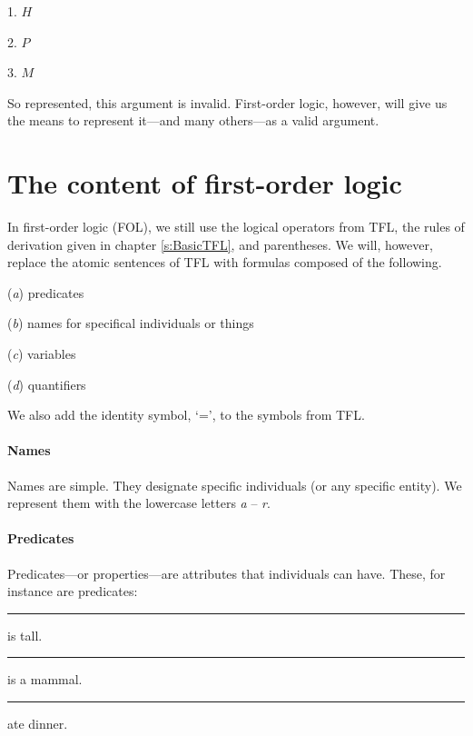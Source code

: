 \noindent\begin{minipage}{0.99\textwidth}
\bigskip
\begin{earg}
\item[1.] $H$
\item[2.] $P$
\item[3.] $M$
\end{earg}
\smallskip
\end{minipage}

\noindent So represented, this argument is invalid. First-order logic, however, will give us the means to represent it---and many others---as a valid argument.


\section{The content of first-order logic}

In first-order logic (FOL), we still use the logical operators from TFL, the rules of derivation given in chapter \ref{s:BasicTFL}, and parentheses. We will, however, replace the atomic sentences of TFL with formulas composed of the following.

\begin{ebullet}
	\item[(\textit{a})] predicates
	\item[(\textit{b})] names for specifical individuals or things 
	\item[(\textit{c})] variables 
	\item[(\textit{d})] quantifiers
\end{ebullet}
We also add the identity symbol, ‘=’, to the symbols from TFL.  


\paragraph{Names}

Names are simple. They designate specific individuals (or any specific entity). We represent them with the lowercase letters \textit{a} -- \textit{r}.

\paragraph{Predicates}

Predicates---or properties---are attributes that individuals can have. These, for instance are predicates:

\begin{ebullet}
	\item[] \rule{1cm}{0.15mm} is tall.
	\item[] \rule{1cm}{0.15mm} is a mammal.
	\item[] \rule{1cm}{0.15mm} ate dinner.
\end{ebullet}

